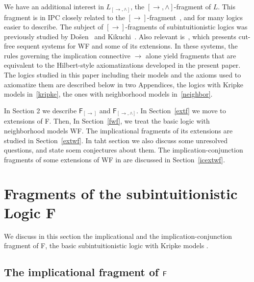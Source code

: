 \documentclass[12pt]{article}
\newtheorem{dfn}[thm]{Definition}
\begin{document}
We have an additional interest in $ L_{[\rightarrow, \wedge]} $,  the $[\rightarrow , \wedge]$-fragment of $L$.
This fragment is in {\sf IPC} closely related to the  $[\rightarrow]$-fragment~\cite{Ren}, and for many logics easier to describe. The subject of $ [\rightarrow] $-fragments of subintuitionistic logics was previously studied by Do\v{s}en~\cite{Dosen} and Kikuchi~\cite{Kent}. Also relevant is~\cite{Maleki}, which presents cut-free sequent systems for {\sf WF} and some of its extensions. In these systems, the rules governing the implication connective $\rightarrow$ alone yield fragments that are equivalent to the Hilbert-style axiomatizations developed in the present paper.
The logics studied in this paper including their models and the axioms used to axiomatize them are described below in two Appendices, the logics with Kripke models in~\ref{kripke}, the ones with neighborhood models in~\ref{neighbor}.

In Section 2 we describe $\mathsf{F_{[\rightarrow]}}$ and $\mathsf{F_{[\rightarrow,\wedge]}}$. In Section~\ref{extf} we move to extensions of {\sf F}. Then, In Section~\ref{fwf}, we treat the basic logic with neighborhood models {\sf WF}. The implicational fragments of its extensions are studied in Section~\ref{extwf}. In taht section we also discuss some unresolved questions, and state soem conjectures about them. The implication-conjunction fragments of some extensions of {\sf WF} in are discussed in Section~\ref{icextwf}. 


\section{Fragments of the subintuitionistic Logic {\sf F}}

We discuss in this section the implicational and the implication-conjunction fragment of {\sf F}, the basic subintuitionistic logic with Kripke models \cite{Co,Dic}. 


\subsection{The implicational fragment of $ {\sf F}  $}

\end{document}
